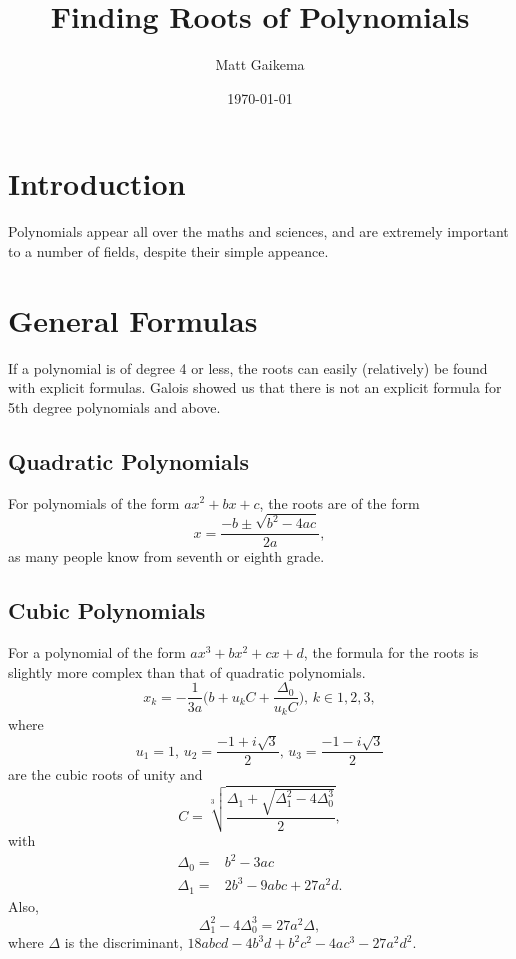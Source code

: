 \documentclass{article}
\title{Finding Roots of Polynomials}
\author{Matt Gaikema}
\date{\today}
\begin{document}
\maketitle


\section{Introduction}

Polynomials appear all over the maths and sciences, and are extremely important to a number of fields, despite their simple appeance.




\section{General Formulas}

If a polynomial is of degree 4 or less, the roots can easily (relatively) be found with explicit formulas.
Galois showed us that there is not an explicit formula for 5th degree polynomials and above.

\subsection{Quadratic Polynomials}

For polynomials of the form $ax^2+bx+c$, the roots are of the form
\begin{equation}
	x = \frac{-b\pm\sqrt{b^2-4ac}}{2a},
\end{equation}
as many people know from seventh or eighth grade. 

\subsection{Cubic Polynomials}

For a polynomial of the form $ax^3+bx^2+cx+d$, the formula for the roots is slightly more complex than that of quadratic polynomials.\cite{wiki:cubic}
\begin{equation}
	x_k=-\frac{1}{3a}\bigg(b+u_kC+\frac{\Delta_0}{u_kC}\bigg),\,k\in{1,2,3},
\end{equation}
where 
\[u_1=1,\,u_2=\frac{-1+i\sqrt{3}}{2},\,u_3=\frac{-1-i\sqrt{3}}{2}\]
are the cubic roots of unity and
\[C=\sqrt[3]{\frac{\Delta_1+\sqrt{\Delta_1^2-4\Delta_0^3}}{2}},\]
with 
\begin{align*}
	\Delta_0 =& b^2-3ac \\
	\Delta_1 =& 2b^3-9abc+27a^2d.
\end{align*}
Also,
\[\Delta_1^2-4\Delta_0^3=27a^2\Delta,\]
where $\Delta$ is the discriminant, $18abcd-4b^3d+b^2c^2-4ac^3-27a^2d^2$.
\end{document}
